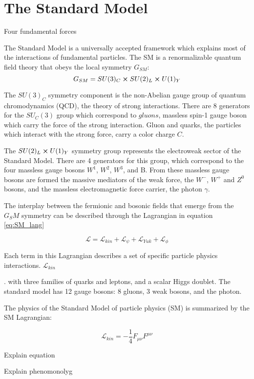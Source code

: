 \chapter{The Standard Model}
Four fundamental forces

The Standard Model is a universally accepted framework which explains most of the interactions of fundamental particles. The SM is a renormalizable quantum field theory that obeys the local symmetry $G_{SM}$:
\begin{equation}
	G_{SM} = SU(3)_C \cross SU(2)_L \cross U(1)_Y
\end{equation}

The $SU(3)_C$ symmetry component is the non-Abelian gauge group of quantum chromodynamics (QCD), the theory of strong interactions. There are 8 generators for the $SU_C (3)$ group which correspond to $gluons$, massless spin-1 gauge boson which carry the force of the strong interaction. Gluon and quarks, the particles which interact with the strong force, carry a color charge $C$. \par

The $SU(2)_L \cross U(1)_Y$ symmetry group represents the electroweak sector of the Standard Model. There are 4 generators for this group, which correspond to the four massless gauge bosons $W^1$, $W^2$, $W^3$, and B. From these massless gauge bosons are formed the massive mediators of the weak force, the $W^-$, $W^+$ and $Z^0$ bosons, and the massless electromagnetic force carrier, the photon $\gamma$. \par

The interplay between the fermionic and bosonic fields that emerge from the $G_SM$ symmetry can be described through the Lagrangian in equation \ref{eq:SM_lang}

\begin{equation}
	\mathcal{L} = \mathcal{L}_{kin} + \mathcal{L}_{\psi} + \mathcal{L}_{Yuk} + \mathcal{L}_{\phi}
	\label{eq:SM_lang}
\end{equation}

Each term in this Lagrangian describes a set of specific particle physics interactions. $\mathcal{L}_{kin} $

. with three families of quarks and leptons, and a scalar Higgs doublet. The standard model has 12 gauge bosons: 8 gluons, 3 weak bosons, and the photon. \cite{pdg}
	

	
The physics of the Standard Model of particle physics (SM) is summarized by the SM Lagrangian:

\begin{equation}
	\mathcal{L}_{kin} = -\frac{1}{4} F_{\mu \nu} F^{\mu \nu}
\end{equation}

Explain equation

Explain phenomonolyg